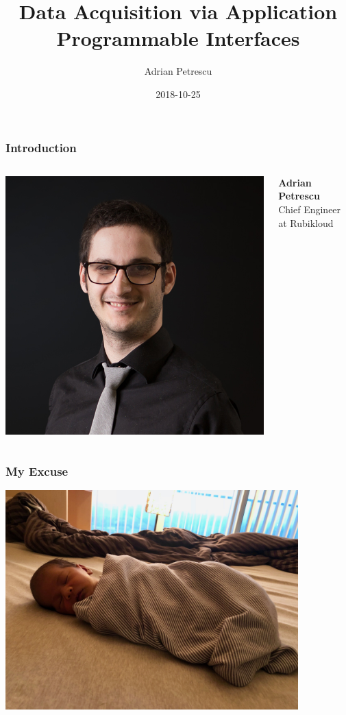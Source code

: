 \documentclass[dvipsnames]{beamer}
\title[Data Acquisition via APIs]{Data Acquisition via Application Programmable Interfaces}
\author{Adrian Petrescu}
\institute{Rubikloud}
\date{2018-10-25}
\begin{document}
\frame{\titlepage}


\begin{frame}
  \frametitle{Introduction}

  \begin{columns}

    \includegraphics{img/speaker-headshot.png}

    \textbf{Adrian Petrescu} \\
    Chief Engineer at Rubikloud
  \end{columns}
\end{frame}

\begin{frame}
  \frametitle{My Excuse}
  \begin{center}
    \includegraphics[width=320pt]{img/calvin.jpg}
  \end{center}
\end{frame}
\end{document}
